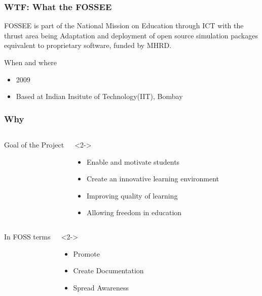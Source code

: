 \documentclass[compress,red]{beamer} %
\begin{document}
\begin{frame}
\frametitle{WTF: What the FOSSEE}
\begin{block}{FOSSEE}
is  part of the National Mission on Education through ICT with the thrust area being \alert{Adaptation and deployment of open source simulation packages equivalent to proprietary software}, funded by MHRD.
\end{block}
\begin{block}{When and where}
\begin{itemize}
\item 2009
\item Based at Indian Insitute of Technology(IIT), Bombay 
\end{itemize}
\end{block}
\end{frame}

\begin{frame}
\frametitle{Why}
\begin{columns}
\begin{exampleblock}{}
Goal of the Project
\end{exampleblock}
\begin{exampleblock}<2->{}
\begin{itemize}
\item Enable and motivate students
\item Create an innovative learning environment
\item Improving quality of learning
\item Allowing freedom in education
\end{itemize}
\end{exampleblock}
\end{columns}
\end{frame}

\begin{frame}
\begin{columns}
\begin{exampleblock}{}
In FOSS terms
\end{exampleblock}
\begin{exampleblock}<2->{}
\begin{itemize}
\item Promote 
\item Create Documentation
\item Spread Awareness
\end{itemize}
\end{exampleblock}
\end{columns}
\end{frame}
\end{document}
